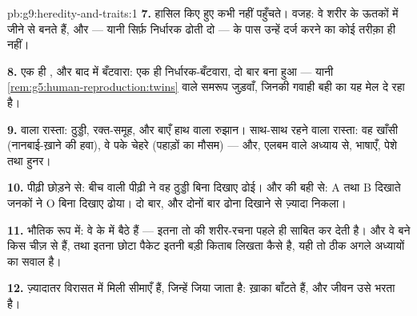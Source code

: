 \begin{solution}{pb:g9:heredity-and-traits:1}
\textbf{7.} हासिल किए हुए  कभी नहीं पहुँचते। वजह: वे शरीर के ऊतकों
में जीने से बनते हैं, और  --- यानी सिर्फ़ निर्धारक ढोती दो
 --- के पास उन्हें दर्ज करने का कोई तरीक़ा ही नहीं।

\textbf{8.} एक ही , और बाद में बँटवारा: एक ही निर्धारक-बँटवारा,
दो बार बना हुआ --- यानी \cref{rem:g5:human-reproduction:twins} वाले
समरूप जुड़वाँ, जिनकी गवाही बही का यह मेल दे रहा है।

\textbf{9.}  वाला रास्ता: ठुड्डी, रक्त-समूह, और बाएँ हाथ वाला
रुझान। साथ-साथ रहने वाला रास्ता: वह खाँसी (नानबाई-ख़ाने की हवा), वे पके
चेहरे (पहाड़ों का मौसम) --- और, एलबम वाले अध्याय से, भाषाएँ, पेशे तथा
हुनर।

\textbf{10.} पीढ़ी छोड़ने से: बीच वाली पीढ़ी ने वह ठुड्डी बिना दिखाए ढोई।
और  की बही से: A तथा B दिखाते जनकों ने O बिना दिखाए ढोया। दो बार,
और दोनों बार ढोना दिखाने से ज़्यादा निकला।

\textbf{11.} भौतिक रूप में: वे  के  में बैठे हैं ---
इतना तो  की शरीर-रचना पहले ही साबित कर देती है। और वे बने किस
चीज़ से हैं, तथा इतना छोटा पैकेट इतनी बड़ी किताब लिखता कैसे है, यही तो
ठीक अगले अध्यायों का सवाल है।

\textbf{12.} ज़्यादातर  विरासत में मिली सीमाएँ हैं, जिन्हें जिया
जाता है:  ख़ाका बाँटते हैं, और जीवन उसे भरता है।
\end{solution}
